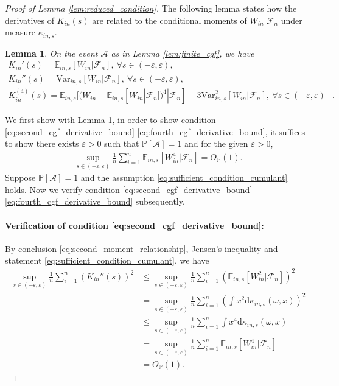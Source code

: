 \documentclass[12pt]{article}
\newtheorem{lemma}{Lemma}
\theoremstyle{definition}
\def\P{\mathbb{P}}
\def\P{\mathbb{P}}
\newcommand{\E}{\mathbb E}								%
\newcommand{\V}{\mathrm{Var}}							%
\renewcommand{\P}{\mathbb{P}}							%
\begin{document}
\begin{proof}[Proof of Lemma \ref{lem:reduced_condition}]
	The following lemma states how the derivatives of $K_{in}(s)$ are related to the conditional moments of $W_{in}|\mathcal{F}_n$ under measure $\kappa_{in,s}$.
	\begin{lemma}\label{lem:tilted_moment}
		On the event $\mathcal{A}$ as in Lemma \ref{lem:finite_cgf}, we have 
		\begin{align}
			K_{in}'(s)=\E_{in,s}[W_{in}|\mathcal{F}_n],\ \forall s\in (-\varepsilon,\varepsilon),
			&\label{eq:first_moment_relationship}\\
			K_{in}''(s)=\V_{in,s}[W_{in}|\mathcal{F}_n],\ \forall s\in (-\varepsilon,\varepsilon),
			&\label{eq:second_moment_relationship}\\
			K_{in}^{(4)}(s)=\E_{in,s}[(W_{in}-\E_{in,s}[W_{in}|\mathcal{F}_n])^4|\mathcal{F}_n]-3\V^2_{in,s}[W_{in}|\mathcal{F}_n],\ \forall s\in (-\varepsilon,\varepsilon)
			&\label{eq:fourth_moment_relationship}.
		\end{align}
	\end{lemma}
	\noindent We first show with Lemma \ref{lem:tilted_moment}, in order to show condition \eqref{eq:second_cgf_derivative_bound}-\eqref{eq:fourth_cgf_derivative_bound}, it suffices to show there exists $\varepsilon>0$ such that $\P[\mathcal{A}]=1$ and for the given $\varepsilon>0$,
	\begin{align}\label{eq:sufficient_condition_cumulant}
		\sup_{s\in (-\varepsilon,\varepsilon)}\frac{1}{n}\sum_{i=1}^n \E_{in,s}[W_{in}^4|\mathcal{F}_n]=O_{\P}(1).
	\end{align}
	Suppose $\P[\mathcal{A}]=1$ and the assumption \eqref{eq:sufficient_condition_cumulant} holds. Now we verify condition \eqref{eq:second_cgf_derivative_bound}-\eqref{eq:fourth_cgf_derivative_bound} subsequently. 

	\paragraph{Verification of condition \eqref{eq:second_cgf_derivative_bound}:}

	By conclusion \eqref{eq:second_moment_relationship}, Jensen's inequality and statement \eqref{eq:sufficient_condition_cumulant}, we have
	\begin{align*}
		\sup_{s\in (-\varepsilon,\varepsilon)}\frac{1}{n}\sum_{i=1}^n (K_{in}''(s))^2
		&
		\leq \sup_{s\in (-\varepsilon,\varepsilon)}\frac{1}{n}\sum_{i=1}^n (\E_{in,s}[W_{in}^2|\mathcal{F}_n])^2\\
		&
		=\sup_{s\in (-\varepsilon,\varepsilon)}\frac{1}{n}\sum_{i=1}^n \left(\int x^2\mathrm{d}\kappa_{in,s}(\omega,x)\right)^2\\
		&
		\leq \sup_{s\in (-\varepsilon,\varepsilon)}\frac{1}{n}\sum_{i=1}^n \int x^4\mathrm{d}\kappa_{in,s}(\omega,x)\\
		&
		= \sup_{s\in (-\varepsilon,\varepsilon)}\frac{1}{n}\sum_{i=1}^n \E_{in,s}[W_{in}^4|\mathcal{F}_n]\\
		&
		=O_{\P}(1).
	\end{align*}


\end{proof}
\end{document}

